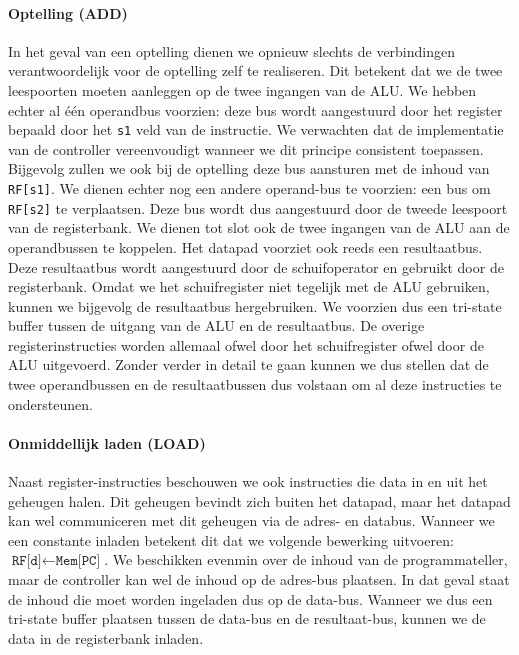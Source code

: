 \paragraph{Optelling (ADD)}
In het geval van een optelling dienen we opnieuw slechts de verbindingen verantwoordelijk voor de optelling zelf te realiseren. Dit betekent dat we de twee leespoorten moeten aanleggen op de twee ingangen van de ALU. We hebben echter al \'e\'en operandbus voorzien: deze bus wordt aangestuurd door het register bepaald door het \verb+s1+ veld van de instructie. We verwachten dat de implementatie van de controller vereenvoudigt wanneer we dit principe consistent toepassen. Bijgevolg zullen we ook bij de optelling deze bus aansturen met de inhoud van \verb+RF[s1]+. We dienen echter nog een andere operand-bus te voorzien: een bus om \verb+RF[s2]+ te verplaatsen. Deze bus wordt dus aangestuurd door de tweede leespoort van de registerbank. We dienen tot slot ook de twee ingangen van de ALU aan de operandbussen te koppelen. Het datapad voorziet ook reeds een resultaatbus. Deze resultaatbus wordt aangestuurd door de schuifoperator en gebruikt door de registerbank. Omdat we het schuifregister niet tegelijk met de ALU gebruiken, kunnen we bijgevolg de resultaatbus hergebruiken. We voorzien dus een tri-state buffer tussen de uitgang van de ALU en de resultaatbus. De overige registerinstructies worden allemaal ofwel door het schuifregister ofwel door de ALU uitgevoerd. Zonder verder in detail te gaan kunnen we dus stellen dat de twee operandbussen en de resultaatbussen dus volstaan om al deze instructies te ondersteunen.
\paragraph{Onmiddellijk laden (LOAD)}
Naast register-instructies beschouwen we ook instructies die data in en uit het geheugen halen. Dit geheugen bevindt zich buiten het datapad, maar het datapad kan wel communiceren met dit geheugen via de adres- en databus. Wanneer we een constante inladen betekent dit dat we volgende bewerking uitvoeren: $\texttt{RF[d]}\leftarrow\texttt{Mem[PC]}$. We beschikken evenmin over de inhoud van de programmateller, maar de controller kan wel de inhoud op de adres-bus plaatsen. In dat geval staat de inhoud die moet worden ingeladen dus op de data-bus. Wanneer we dus een tri-state buffer plaatsen tussen de data-bus en de resultaat-bus, kunnen we de data in de registerbank inladen.
